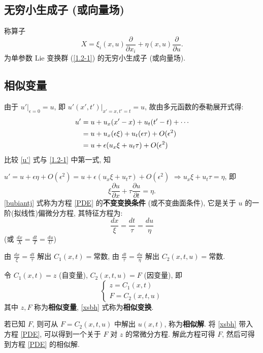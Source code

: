 \subsection{无穷小生成子 (或向量场)}
称算子
\begin{equation}\label{1.2-2}
X=\xi_i(x,u)\frac{\partial}{\partial x_i}+\eta(x,u)\frac{\partial}{\partial u}.
\end{equation}
为单参数 Lie 变换群 (\ref{1.2-1}) 的无穷小生成子 (或向量场).

\subsection{相似变量}
由于 $u'|_{\epsilon=0}=u$, 即 $u'(x',t')|_{x'=x,t'=t}=u$, 故由多元函数的泰勒展开式得:
\begin{align}\label{u'}
u'& =u+u_x(x'-x)+u_t(t'-t)+\cdots\notag \\
  & =u+u_x(\epsilon\xi)+u_t(\epsilon\tau)+O(\epsilon^2)\notag \\
  & =u+\epsilon(u_x\xi+u_t\tau)+O(\epsilon^2)
\end{align}
比较 \eqref{u'} 式与 \eqref{1.2-1} 中第一式, 知

$u'=u+\epsilon\eta+O(\epsilon^2)=u+\epsilon(u_x\xi+u_t\tau)+O(\epsilon^2)$
$\Rightarrow u_x\xi+u_t\tau=\eta$, 即
\begin{equation}\label{bubiantj}
\xi\frac{\partial u}{\partial x}+\tau\frac{\partial u}{\partial t}=\eta.
\end{equation}
{\eqref{bubiantj} 式称为方程 \eqref{PDE} 的\textbf{不变变换条件} (或不变曲面条件)}, 它是关于 $u$ 的一阶(拟线性)偏微分方程, 其特征方程为:
\begin{equation}
\frac{dx}{\xi}=\frac{dt}{\tau}=\frac{du}{\eta}
\end{equation}
(或 $\frac{dx}{X}=\frac{dt}{T}=\frac{du}{U}$)

由 $\frac{dx}{\xi}=\frac{dt}{\tau}$ 解出 $C_1(x,t)=\text{常数}$, 由 $\frac{dt}{\tau}=\frac{du}{\eta}$ 解出 $C_2(x,t,u)=\text{常数}$.

令 $C_1(x,t)=z$ (自变量), $C_2(x,t,u)=F$ (因变量), 即
\begin{equation}\label{xsbh}
\begin{cases}
z=C_1(x,t)\\
F=C_2(x,t,u)
\end{cases}
\end{equation}
其中 $z,F$ 称为\textbf{相似变量}, \eqref{xsbh} 式称为\textbf{相似变换}.

若已知 $F$, 则可从 $F=C_2(x,t,u)$ 中解出 $u(x,t)$, 称为\textbf{相似解}.
将 \eqref{xsbh} 带入方程 \eqref{PDE}, 可以得到一个关于 $F$ 对 $z$ 的常微分方程. 解此方程可得 $F$, 然后可得到方程 \eqref{PDE} 的相似解.

